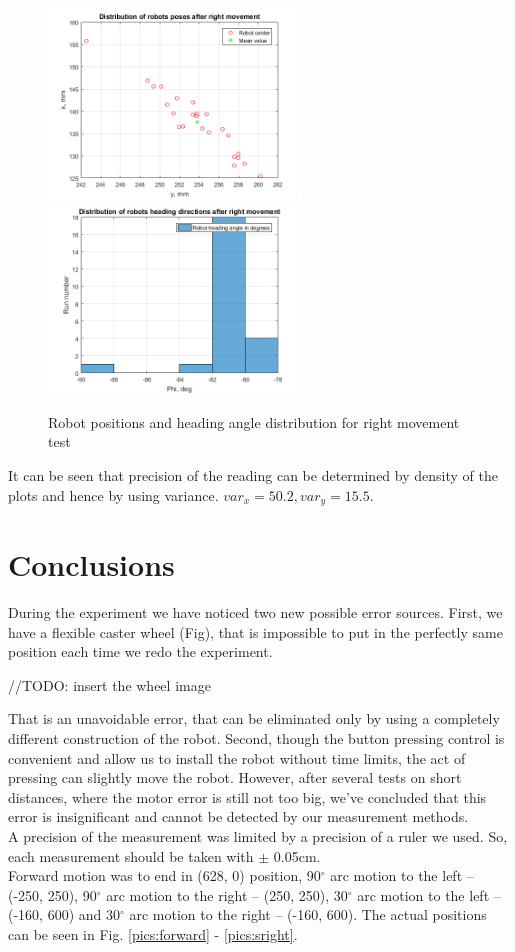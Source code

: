 \documentclass[a4paper, 12pt]{article}
\begin{document}
\begin{figure}[h]
  \centering
  \caption{Robot positions and heading angle distribution for right movement test\label{fig:RR}}
  \includegraphics[width=0.6\textwidth]{RR}
  \includegraphics[width=0.6\textwidth]{RRphi}
\end{figure}

It can be seen that precision of the reading can be determined by density of the plots and hence by using variance. $var_x = 50.2,var_y = 15.5$.


\section{Conclusions}
During the experiment we have noticed two new possible error sources. First, we have a flexible caster wheel (Fig), that is impossible to put in the perfectly same position each time we redo the experiment.

//TODO: insert the wheel image

That is an unavoidable error, that can be eliminated only by using a completely different construction of the robot. Second, though the button pressing control is convenient and allow us to install the robot without time limits, the act of pressing can slightly move the robot. However, after several tests on short distances, where the motor error is still not too big, we've concluded that this error is insignificant and cannot be detected by our measurement methods. \\

A precision of the measurement was limited by a precision of a ruler we used. So, each measurement should be taken with $\pm$ 0.05cm.\\
Forward motion was to end in (628, 0) position, 90$^{\circ}$ arc motion to the left -- (-250, 250), 90$^{\circ}$ arc motion to the right -- (250, 250), 30$^{\circ}$ arc motion to the left -- (-160, 600) and 30$^{\circ}$ arc motion to the right -- (-160, 600). The actual positions can be seen in Fig. \ref{pics:forward} - \ref{pics:sright}.
\end{document}
